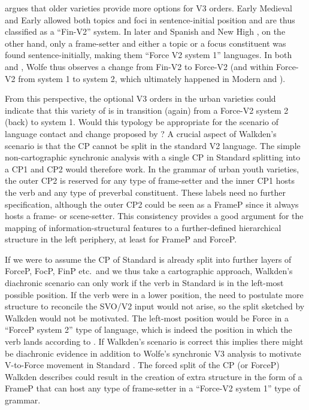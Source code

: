 \documentclass[output=paper]{langsci/langscibook}
\begin{document}
\noindent \citet{Wolfe:2017} argues that older  varieties provide more
options for V3 orders. Early Medieval  and Early  allowed
both topics and foci in sentence-initial position and are thus classified as a
\enquote{Fin-V2} system. In later  and Spanish and New High ,
on the other hand, only a frame-setter and either a topic or a focus
constituent was found sentence-initially, making them \enquote{Force V2 system 1}
languages.  In both  and , Wolfe thus observes a change from
Fin-V2 to Force-V2 (and within Force-V2 from system 1 to system 2, which
ultimately happened in Modern  and ).

From this perspective, the optional V3 orders in the
 urban varieties could indicate that this variety of  is
in transition (again) from a Force-V2 system 2 (back) to system 1. Would this
typology be appropriate for the scenario of language contact and change
proposed by \citet{Walkden:2017}? A crucial aspect of Walkden's scenario is
that the CP cannot be split in the standard V2 language. The
simple non-cartographic synchronic analysis with a single CP in Standard
 splitting into a CP1 and CP2 would therefore work.  In the grammar
of  urban youth varieties, the outer CP2 is reserved for any type of
frame-setter and the inner CP1 hosts the verb and any type of preverbal
constituent. These labels need no further specification, although the outer CP2
could be seen as a FrameP since it always hosts a frame- or scene-setter. This
consistency provides a good argument for the  mapping of information-structural
features to a further-defined hierarchical structure in the left periphery, at
least for FrameP and ForceP.

If we were to assume the CP of Standard  is already split into
further layers of ForceP, FocP, FinP etc.\ and we thus take a cartographic
approach, Walkden's diachronic scenario can only work if the verb in Standard
 is in the left-most possible position. If the verb were in a lower
position, the need to postulate more structure to reconcile the SVO/V2 input
would not arise, so the split sketched by Walkden would not be motivated. The
left-most position would be Force in a \enquote{ForceP system 2} type of
language, which is indeed the position in which the verb lands according to
\citet{Wolfe:2017}. If Walkden's scenario is correct this implies there might
be diachronic evidence in addition to Wolfe's synchronic V3
analysis to motivate V-to-Force movement in Standard
. The forced split of the CP (or ForceP) Walkden describes could
result in the creation of extra structure in the form of a FrameP that can host
any type of frame-setter in a \enquote{Force-V2 system 1} type of grammar.
\end{document}

